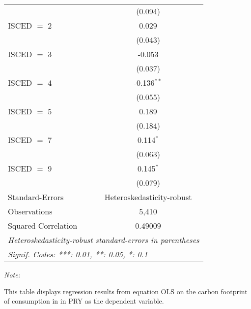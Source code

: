 \begin{table}[htbp!]
\begin{adjustbox}{width = 1\textwidth, max height = 0.95\textheight, center}
\begin{threeparttable}[b]
\begin{tabular}{lc}
                                & (0.094)\\   
            ISCED $=$ 2         & 0.029\\   
                                & (0.043)\\   
            ISCED $=$ 3         & -0.053\\   
                                & (0.037)\\   
            ISCED $=$ 4         & -0.136$^{**}$\\   
                                & (0.055)\\   
            ISCED $=$ 5         & 0.189\\   
                                & (0.184)\\   
            ISCED $=$ 7         & 0.114$^{*}$\\   
                                & (0.063)\\   
            ISCED $=$ 9         & 0.145$^{*}$\\   
                                & (0.079)\\   
            \midrule 
            Standard-Errors     & Heteroskedasticity-robust \\   
            Observations        & 5,410\\  
            Squared Correlation & 0.49009\\  
            \midrule \midrule
            \multicolumn{2}{l}{\emph{Heteroskedasticity-robust standard-errors in parentheses}}\\
            \multicolumn{2}{l}{\emph{Signif. Codes: ***: 0.01, **: 0.05, *: 0.1}}\\
         \end{tabular}
         
         \begin{tablenotes}\item \medskip \textit{Note:}
            \item This table displays regression results from equation OLS on the carbon footprint of consumption in  in PRY as the dependent variable.  
         \end{tablenotes}
      \end{threeparttable}
   \end{adjustbox}
\end{table}


